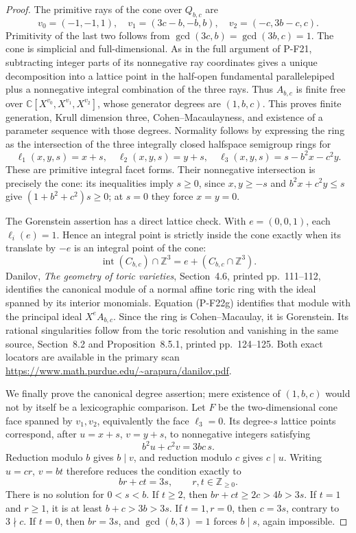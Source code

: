 \documentclass[11pt,a4paper]{article}
\begin{document}
\begin{proof}
The primitive rays of the cone over $Q_{b,c}$ are
\[
 v_0=(-1,-1,1),\quad
 v_1=(3c-b,-b,b),\quad
 v_2=(-c,3b-c,c).
 \tag{P-F22e}
\]
Primitivity of the last two follows from
$\gcd(3c,b)=\gcd(3b,c)=1$. The cone is simplicial and
full-dimensional. As in the full argument of P-F21, subtracting
integer parts of its nonnegative ray coordinates gives a unique
decomposition into a lattice point in the half-open fundamental
parallelepiped plus a nonnegative integral combination of the
three rays. Thus $A_{b,c}$ is finite free over
$\mathbb C[X^{v_0},X^{v_1},X^{v_2}]$, whose generator degrees
are $(1,b,c)$. This proves finite generation, Krull dimension
three, Cohen--Macaulayness, and existence of a parameter sequence
with those degrees. Normality follows by expressing the ring as
the intersection of the three integrally closed halfspace
semigroup rings for
\[
 \ell_1(x,y,s)=x+s,\quad
 \ell_2(x,y,s)=y+s,\quad
 \ell_3(x,y,s)=s-b^2x-c^2y.
 \tag{P-F22f}
\]
These are primitive integral facet forms. Their nonnegative
intersection is precisely the cone: its inequalities imply
$s\ge0$, since $x,y\ge-s$ and
$b^2x+c^2y\le s$ give $(1+b^2+c^2)s\ge0$; at $s=0$
they force $x=y=0$.

The Gorenstein assertion has a direct lattice check. With
$e=(0,0,1)$, each $\ell_i(e)=1$. Hence an integral point is
strictly inside the cone exactly when its translate by $-e$
is an integral point of the cone:
\[
 \operatorname{int}(C_{b,c})\cap\mathbb Z^3
       =e+(C_{b,c}\cap\mathbb Z^3).
 \tag{P-F22g}
\]
Danilov, \emph{The geometry of toric varieties}, Section~4.6,
printed pp.~111--112, identifies the canonical module of a
normal affine toric ring with the ideal spanned by its interior
monomials. Equation (P-F22g) identifies that module with the
principal ideal $X^eA_{b,c}$. Since the ring is Cohen--Macaulay,
it is Gorenstein. Its rational singularities follow from the
toric resolution and vanishing in the same source, Section~8.2
and Proposition~8.5.1, printed pp.~124--125. Both exact locators
are available in the primary scan
\url{https://www.math.purdue.edu/~arapura/danilov.pdf}.

We finally prove the canonical degree assertion; mere existence
of $(1,b,c)$ would not by itself be a lexicographic comparison.
Let $F$ be the two-dimensional cone face spanned by $v_1,v_2$,
equivalently the face $\ell_3=0$. Its degree-$s$ lattice points
correspond, after $u=x+s$, $v=y+s$, to nonnegative integers
satisfying
\[
 b^2u+c^2v=3bc\,s.
\]
Reduction modulo $b$ gives $b\mid v$, and reduction modulo $c$
gives $c\mid u$. Writing $u=cr$, $v=bt$ therefore reduces the
condition exactly to
\[
 br+ct=3s,\qquad r,t\in\mathbb Z_{\ge0}.
 \tag{P-F22h}
\]
There is no solution for $0<s<b$. If $t\ge2$, then
$br+ct\ge2c>4b>3s$. If $t=1$ and $r\ge1$, it is at least
$b+c>3b>3s$. If $t=1,r=0$, then $c=3s$, contrary to
$3\nmid c$. If $t=0$, then $br=3s$, and $\gcd(b,3)=1$
forces $b\mid s$, again impossible.


\end{proof}
\end{document}
